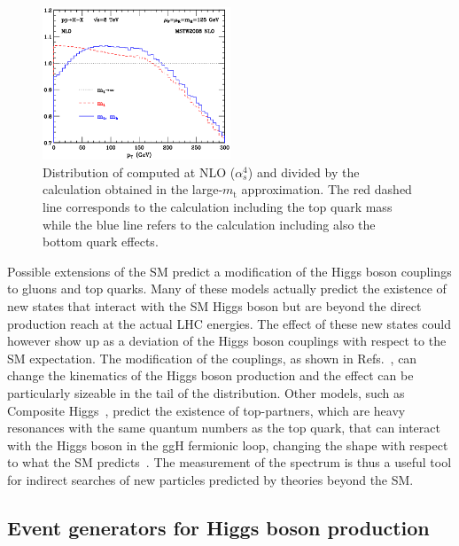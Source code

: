 \begin{figure}[htb]
\centering
\includegraphics[width=0.5\textwidth]{images/pth_quarkmass.png}
\caption{Distribution of \pth computed at NLO ($\alpha_s^4$) and divided by the calculation obtained in the large-$m_\mathrm{t}$ approximation. The red dashed line corresponds to the calculation including the top quark mass while the blue line refers to the calculation including also the bottom quark effects.}\label{fig:pth_quarkmass}
\end{figure}

Possible extensions of the SM predict a modification of the Higgs boson couplings to gluons and top quarks. Many of these models actually predict the existence of new states that interact with the SM Higgs boson but are beyond the direct production reach at the actual LHC energies. The effect of these new states could however show up as a deviation of the Higgs boson couplings with respect to the SM expectation. The modification of the couplings, as shown in Refs.~\cite{Azatov:2013xha,Harlander:2013oja}, can change the kinematics of the Higgs boson production and the effect can be particularly sizeable in the tail of the \pth distribution. 
Other models, such as Composite Higgs~\cite{Marzocca:2012zn}, predict the existence of top-partners, which are heavy resonances with the same quantum numbers as the top quark, that can interact with the Higgs boson in the ggH fermionic loop, changing the \pth shape with respect to what the SM predicts~\cite{Banfi:2013yoa}.
The measurement of the \pth spectrum is thus a useful tool for indirect searches of new particles predicted by theories beyond the SM.





\subsection{Event generators for Higgs boson production}

